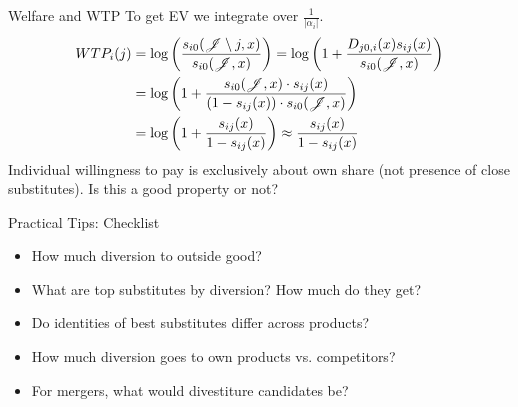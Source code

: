 \documentclass[aspectratio=169,10pt]{beamer}
\begin{document}
\begin{frame}{Welfare and WTP}
To get EV we integrate over $\frac{1}{|\alpha_i|}$.
\begin{align*}
WTP_i(j) &=\log \left( \frac{s_{i0}(\mathscr{J}\setminus j,x) }{s_{i0}(\mathscr{J},x) }\right)
=\log \left( 1+\frac{D_{j0,i}(x) s_{ij}(x)}{s_{i0}(\mathscr{J},x) }\right)\\
&=\log \left( 1+\frac{s_{i0}(\mathscr{J},x) \cdot s_{ij}(x)}{(1-s_{ij}(x)) \cdot s_{i0}(\mathscr{J},x) }\right)\\
&=\log \left( 1+\frac{s_{ij}(x)}{1-s_{ij}(x)  }\right)
\approx \frac{s_{ij}(x)}{1-s_{ij}(x) }
\end{align*}
Individual willingness to pay is exclusively about \alert{own share} (not presence of close substitutes). Is this a good property or not?
\end{frame}


\begin{frame}{Practical Tips: Checklist}
\begin{itemize}
\item How much diversion to outside good?
\item What are top substitutes by diversion? How much do they get?
\item Do identities of best substitutes differ across products?
\item How much diversion goes to own products vs. competitors?
\item For mergers, what would \alert{divestiture} candidates be?
\end{itemize}
\end{frame}
\end{document}
